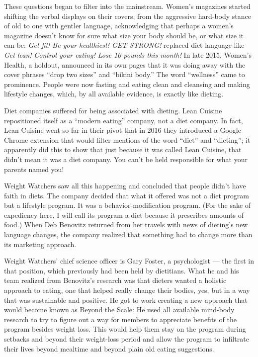 These questions began to filter into the mainstream. Women's magazines
started shifting the verbal displays on their covers, from the
aggressive hard-body stance of old to one with gentler language,
acknowledging that perhaps a women's magazine doesn't know for sure what
size your body should be, or what size it can be: \emph{Get fit! Be your
healthiest! GET STRONG!} replaced diet language like \emph{Get lean!}
\emph{Control your eating! Lose 10 pounds this month!} In late 2015,
Women's Health, a holdout, announced in its own pages that it was doing
away with the cover phrases ``drop two sizes'' and ``bikini body.'' The
word ``wellness'' came to prominence. People were now fasting and eating
clean and cleansing and making lifestyle changes, which, by all
available evidence, is exactly like dieting.

Diet companies suffered for being associated with dieting. Lean Cuisine
repositioned itself as a ``modern eating'' company, not a diet company.
In fact, Lean Cuisine went so far in their pivot that in 2016 they
introduced a Google Chrome extension that would filter mentions of the
word ``diet'' and ``dieting''; it apparently did this to show that just
because it was called Lean Cuisine, that didn't mean it was a diet
company. You can't be held responsible for what your parents named you!

Weight Watchers saw all this happening and concluded that people didn't
have faith in diets. The company decided that what it offered was not a
diet program but a lifestyle program. It was a behavior-modification
program. (For the sake of expediency here, I will call its program a
diet because it prescribes amounts of food.) When Deb Benovitz returned
from her travels with news of dieting's new language changes, the
company realized that something had to change more than its marketing
approach.

Weight Watchers' chief science officer is Gary Foster, a psychologist
--- the first in that position, which previously had been held by
dietitians. What he and his team realized from Benovitz's research was
that dieters wanted a holistic approach to eating, one that helped
really change their bodies, yes, but in a way that was sustainable and
positive. He got to work creating a new approach that would become known
as Beyond the Scale: He used all available mind-body research to try to
figure out a way for members to appreciate benefits of the program
besides weight loss. This would help them stay on the program during
setbacks and beyond their weight-loss period and allow the program to
infiltrate their lives beyond mealtime and beyond plain old eating
suggestions.

